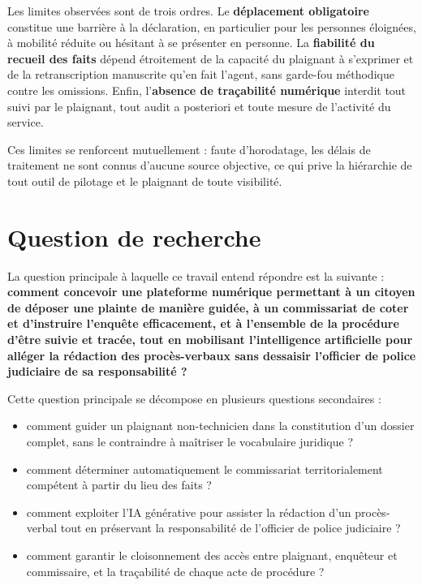 Les limites observées sont de trois ordres. Le \textbf{déplacement obligatoire} constitue une barrière à la déclaration, en particulier pour les personnes éloignées, à mobilité réduite ou hésitant à se présenter en personne. La \textbf{fiabilité du recueil des faits} dépend étroitement de la capacité du plaignant à s'exprimer et de la retranscription manuscrite qu'en fait l'agent, sans garde-fou méthodique contre les omissions. Enfin, l'\textbf{absence de traçabilité numérique} interdit tout suivi par le plaignant, tout audit a posteriori et toute mesure de l'activité du service.

Ces limites se renforcent mutuellement : faute d'horodatage, les délais de traitement ne sont connus d'aucune source objective, ce qui prive la hiérarchie de tout outil de pilotage et le plaignant de toute visibilité.

\section*{Question de recherche}

La question principale à laquelle ce travail entend répondre est la suivante : \textbf{comment concevoir une plateforme numérique permettant à un citoyen de déposer une plainte de manière guidée, à un commissariat de coter et d'instruire l'enquête efficacement, et à l'ensemble de la procédure d'être suivie et tracée, tout en mobilisant l'intelligence artificielle pour alléger la rédaction des procès-verbaux sans dessaisir l'officier de police judiciaire de sa responsabilité ?}

Cette question principale se décompose en plusieurs questions secondaires :

\begin{itemize}
    \item comment guider un plaignant non-technicien dans la constitution d'un dossier complet, sans le contraindre à maîtriser le vocabulaire juridique ?
    \item comment déterminer automatiquement le commissariat territorialement compétent à partir du lieu des faits ?
    \item comment exploiter l'IA générative pour assister la rédaction d'un procès-verbal tout en préservant la responsabilité de l'officier de police judiciaire ?
    \item comment garantir le cloisonnement des accès entre plaignant, enquêteur et commissaire, et la traçabilité de chaque acte de procédure ?
\end{itemize}

